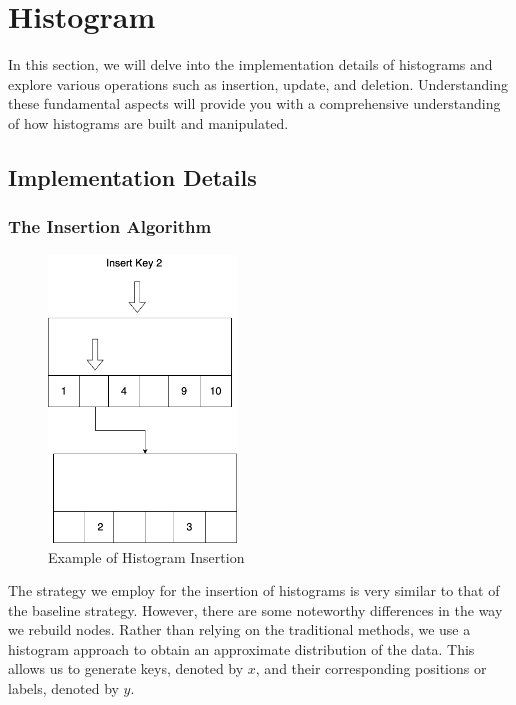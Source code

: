 \chapter{Histogram}

In this section, we will delve into the implementation details of histograms and explore various operations such as insertion, update, and deletion. Understanding these fundamental aspects will provide you with a comprehensive understanding of how histograms are built and manipulated.

\section{Implementation Details}
\subsection{The Insertion Algorithm}


\begin{figure}[H]
    \centering
    \includegraphics[width=50mm,scale=1]{Figures/InsertionHist.png}
    \caption{
     Example of Histogram Insertion
    }
    \label{fig:HistInsertionExample}
\end{figure}

The strategy we employ for the insertion of histograms is very similar to that of the baseline strategy. However, there are some noteworthy differences in the way we rebuild nodes. Rather than relying on the traditional methods, we use a histogram approach to obtain an approximate distribution of the data. This allows us to generate keys, denoted by $x$, and their corresponding positions or labels, denoted by $y$.

